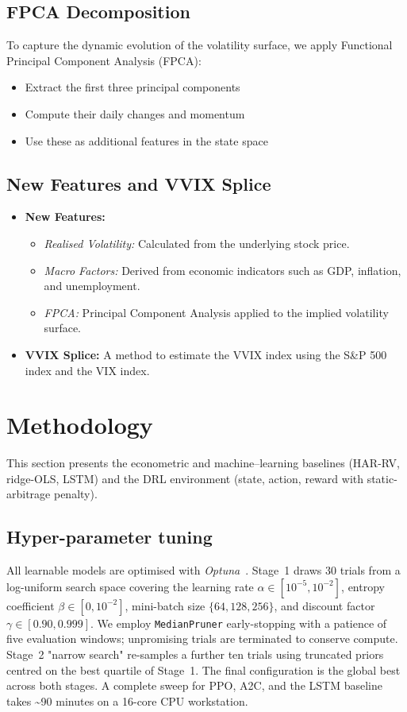 \documentclass[11pt,a4paper]{article}
\begin{document}
\subsection{FPCA Decomposition}
To capture the dynamic evolution of the volatility surface, we apply Functional Principal Component Analysis (FPCA):
\begin{itemize}
    \item Extract the first three principal components
    \item Compute their daily changes and momentum
    \item Use these as additional features in the state space
\end{itemize}

\subsection{New Features and VVIX Splice}
\begin{itemize}
    \item \textbf{New Features:}
        \begin{itemize}
            \item \emph{Realised Volatility:} Calculated from the underlying stock price.
            \item \emph{Macro Factors:} Derived from economic indicators such as GDP, inflation, and unemployment.
            \item \emph{FPCA:} Principal Component Analysis applied to the implied volatility surface.
        \end{itemize}
    \item \textbf{VVIX Splice:} A method to estimate the VVIX index using the S\&P 500 index and the VIX index.
\end{itemize}

\section{Methodology}
This section presents the econometric and machine–learning baselines (HAR-RV, ridge-OLS, LSTM) and the DRL environment (state, action, reward with static-arbitrage penalty).

\subsection{Hyper-parameter tuning}\label{sec:hpo}
All learnable models are optimised with \emph{Optuna}~\citep{akiba2019optuna}.  Stage~1 draws \num{30} trials from a log-uniform search space covering the learning rate \(\alpha\in[10^{-5},10^{-2}]\), entropy coefficient \(\beta\in[0,10^{-2}]\), mini-batch size \(\{64,128,256\}\), and discount factor \(\gamma\in[0.90,0.999]\).  We employ \texttt{MedianPruner} early-stopping with a patience of five evaluation windows; unpromising trials are terminated to conserve compute.  Stage~2 "narrow search" re-samples a further ten trials using truncated priors centred on the best quartile of Stage~1.  The final configuration is the global best across both stages.  A complete sweep for PPO, A2C, and the LSTM baseline takes \textasciitilde90 minutes on a 16-core CPU workstation.
\end{document}
